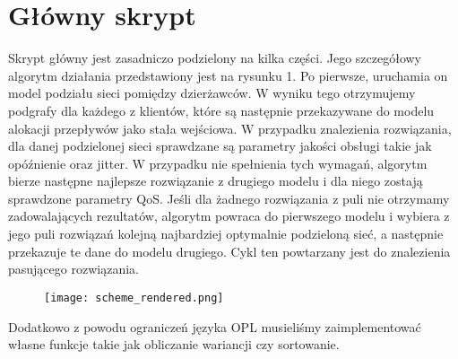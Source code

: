 \section{Główny skrypt}

Skrypt główny jest zasadniczo podzielony na kilka części. Jego szczegółowy algorytm działania przedstawiony
jest na rysunku 1. Po pierwsze, uruchamia on model podziału sieci pomiędzy dzierżawców.
W wyniku tego otrzymujemy podgrafy dla każdego z klientów, które są następnie przekazywane
do modelu alokacji przepływów jako stała wejściowa. W przypadku znalezienia rozwiązania,
dla danej podzielonej sieci sprawdzane są parametry jakości obsługi takie jak opóźnienie
oraz jitter. W przypadku nie spełnienia tych wymagań, algorytm bierze następne najlepsze rozwiązanie z drugiego modelu i dla niego zostają sprawdzone
parametry QoS. Jeśli dla żadnego rozwiązania z puli nie otrzymamy zadowalających rezultatów,
algorytm powraca do pierwszego modelu i wybiera z jego puli rozwiązań kolejną najbardziej
optymalnie podzieloną sieć, a następnie przekazuje te dane do modelu drugiego.
Cykl ten powtarzany jest do znalezienia pasującego rozwiązania.

\begin{figure}
\centering
\texttt{[image: scheme\_rendered.png]}
\end{figure}

Dodatkowo z powodu ograniczeń języka OPL musieliśmy zaimplementować własne funkcje
takie jak obliczanie wariancji czy sortowanie.
